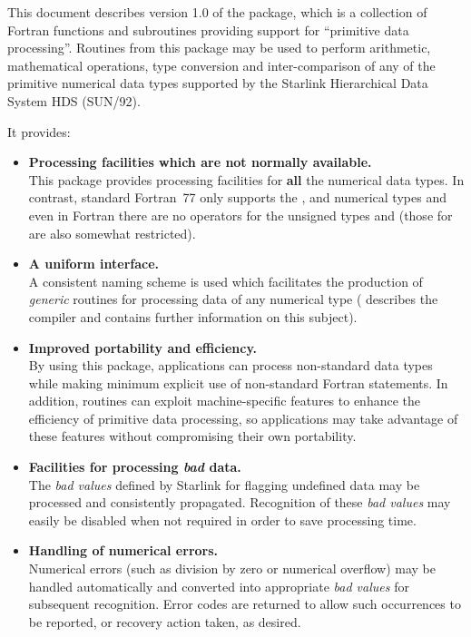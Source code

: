 This document describes version 1.0 of the  package, which
is a collection of Fortran functions and subroutines providing support for
``primitive data processing''. 
Routines from this package may be used to perform arithmetic, mathematical
operations, type conversion and inter-comparison of any of the primitive
numerical data types supported by the Starlink Hierarchical Data System HDS
(SUN/92). 

It provides:

\begin{itemize}

\item {\bf Processing facilities which are not normally available.}\\
This package provides processing facilities for {\bf all} the numerical
 data types.  In contrast, standard Fortran~77 only supports the
,  and  numerical types  and
even in  Fortran there are no operators for the unsigned types
 and  (those for  are also
somewhat restricted). 

\item {\bf A uniform interface.}\\
A consistent naming scheme is used which facilitates the production of {\em
generic} routines for processing data of any numerical type (
describes the  compiler and contains further information on
this subject). 

\item {\bf Improved portability and efficiency.}\\
By using this package, applications can process non-standard data types
while making minimum explicit use of non-standard Fortran statements.
In addition,  routines can exploit machine-specific features
to enhance the efficiency of primitive data processing, so applications may
take advantage of these features without compromising their own portability.

\item {\bf Facilities for processing {\em bad} data.}\\
The {\em bad values} defined by Starlink for flagging undefined data
may be processed and consistently propagated.
Recognition of these {\em bad values} may easily be disabled when not 
required in order to save processing time. 

\item {\bf Handling of numerical errors.}\\
Numerical errors (such as division by zero or numerical overflow) may be
handled automatically and converted into appropriate {\em bad values} for
subsequent recognition. 
Error codes are returned to allow such occurrences to be reported, or
recovery action taken, as desired. 


\end{itemize}
